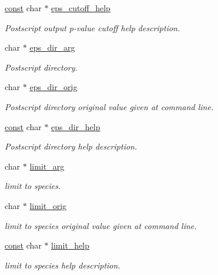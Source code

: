 \begin{DoxyCompactItemize}
\hyperlink{getopt_8c_a2c212835823e3c54a8ab6d95c652660e}{const} char $\ast$ \hyperlink{structgengetopt__args__info_a32790cf21a0f8e8623371d12deb4b337}{eps\+\_\+cutoff\+\_\+help}
\begin{DoxyCompactList}\small\item\em Postscript output p-\/value cutoff help description. \end{DoxyCompactList}\item 
char $\ast$ \hyperlink{structgengetopt__args__info_a29434f1b1030755c24dde59d8c157de5}{eps\+\_\+dir\+\_\+arg}
\begin{DoxyCompactList}\small\item\em Postscript directory. \end{DoxyCompactList}\item 
char $\ast$ \hyperlink{structgengetopt__args__info_a7474b0d19ed3f9c13ebc88e6cf652c65}{eps\+\_\+dir\+\_\+orig}
\begin{DoxyCompactList}\small\item\em Postscript directory original value given at command line. \end{DoxyCompactList}\item 
\hyperlink{getopt_8c_a2c212835823e3c54a8ab6d95c652660e}{const} char $\ast$ \hyperlink{structgengetopt__args__info_a1c676a66f0cf100d49679440032ae4ab}{eps\+\_\+dir\+\_\+help}
\begin{DoxyCompactList}\small\item\em Postscript directory help description. \end{DoxyCompactList}\item 
char $\ast$ \hyperlink{structgengetopt__args__info_afe75799aec30a1011e3f65a93538eb88}{limit\+\_\+arg}
\begin{DoxyCompactList}\small\item\em limit to species. \end{DoxyCompactList}\item 
char $\ast$ \hyperlink{structgengetopt__args__info_a77bc7cac390e1901106ad9c70e04b9aa}{limit\+\_\+orig}
\begin{DoxyCompactList}\small\item\em limit to species original value given at command line. \end{DoxyCompactList}\item 
\hyperlink{getopt_8c_a2c212835823e3c54a8ab6d95c652660e}{const} char $\ast$ \hyperlink{structgengetopt__args__info_ac54bb7e91539b98c4d0756254880b4ee}{limit\+\_\+help}
\begin{DoxyCompactList}\small\item\em limit to species help description. \end{DoxyCompactList}\item 

\end{DoxyCompactItemize}
